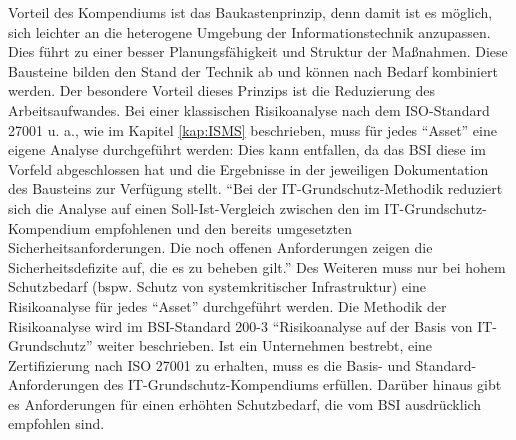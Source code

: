 Vorteil des Kompendiums ist das Baukastenprinzip, denn damit ist es möglich, sich leichter an die heterogene Umgebung der Informationstechnik anzupassen. Dies führt zu einer besser Planungsfähigkeit und Struktur der Maßnahmen.\autocite[vgl.][S.\,2]{bundesamt_fur_sicherheit_in_der_informationstechnik_bsi_it-grundschutz-kompendium_2020} Diese Bausteine bilden den Stand der Technik ab und können nach Bedarf kombiniert werden. Der besondere Vorteil dieses Prinzips ist die Reduzierung des Arbeitsaufwandes. Bei einer klassischen Risikoanalyse nach dem ISO-Standard 27001 u. a., wie im Kapitel \vref{kap:ISMS} beschrieben, muss für jedes \enquote{Asset} eine eigene Analyse durchgeführt werden: Dies kann entfallen, da das \ac{BSI} diese im Vorfeld abgeschlossen hat und die Ergebnisse in der jeweiligen Dokumentation des Bausteins zur Verfügung stellt. \enquote{Bei der IT-Grundschutz-Methodik reduziert sich die Analyse auf einen Soll-Ist-Vergleich zwischen den im IT-Grundschutz-Kompendium empfohlenen und den bereits umgesetzten Sicherheitsanforderungen. Die noch offenen Anforderungen zeigen die Sicherheitsdefizite auf, die es zu beheben gilt.}\autocite[][S.\,3]{bundesamt_fur_sicherheit_in_der_informationstechnik_bsi_it-grundschutz-kompendium_2020} Des Weiteren muss nur bei hohem Schutzbedarf (bspw. Schutz von systemkritischer Infrastruktur) eine Risikoanalyse für jedes \enquote{Asset} durchgeführt werden. Die Methodik der Risikoanalyse wird im BSI-Standard 200-3 \enquote{Risikoanalyse auf der Basis von IT-Grundschutz} weiter beschrieben. Ist ein Unternehmen bestrebt, eine Zertifizierung nach ISO 27001 zu erhalten, muss es die Basis- und Standard-Anforderungen des IT-Grundschutz-Kompendiums erfüllen. Darüber hinaus gibt es Anforderungen für einen erhöhten Schutzbedarf, die vom \ac{BSI} ausdrücklich empfohlen sind.\autocite[vgl.][S.\,3]{bundesamt_fur_sicherheit_in_der_informationstechnik_bsi_it-grundschutz-kompendium_2020} 
\par
